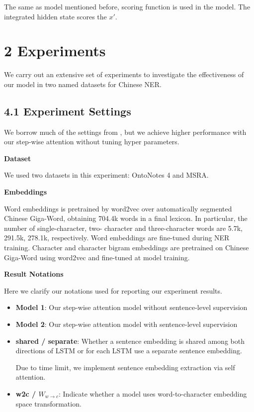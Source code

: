 \documentclass[letterpaper]{article} %
\begin{document}
The same as model mentioned before, scoring function is used in the model. The integrated hidden state scores the $x'$.


\section{2 Experiments}

We carry out an extensive set of experiments to investigate the effectiveness of our model in two named datasets for Chinese NER.

\subsection{4.1 Experiment Settings}
We borrow much of the settings from \cite{lattice}, but we achieve higher performance with our step-wise attention without tuning hyper parameters.

\textbf{Dataset} 

We used two datasets in this experiment: OntoNotes 4 and MSRA. 

\textbf{Embeddings} 

Word embeddings is pretrained by word2vec over automatically segmented Chinese Giga-Word, obtaining 704.4k words in a final lexicon. In particular, the number of single-character, two- character and three-character words are 5.7k, 291.5k, 278.1k, respectively. Word embeddings are fine-tuned during NER training. Character and character bigram embeddings are pretrained on Chinese Giga-Word using word2vec and fine-tuned at model training.


\textbf{Result Notations}

Here we clarify our notations used for reporting our experiment results.

\begin{itemize}
    \item \textbf{Model 1}: Our step-wise attention model without sentence-level supervision
    
    \item \textbf{Model 2}: Our step-wise attention model with sentence-level supervision
    \item \textbf{shared / separate}: Whether a sentence embedding is shared among both directions of LSTM or for each LSTM use a separate sentence embedding. 
    
    Due to time limit, we implement sentence embedding extraction via self attention.
    
    \item \textbf{w2c / $W_{w\rightarrow c}$}: Indicate whether a model uses word-to-character embedding space transformation.
\end{itemize}
\end{document}
